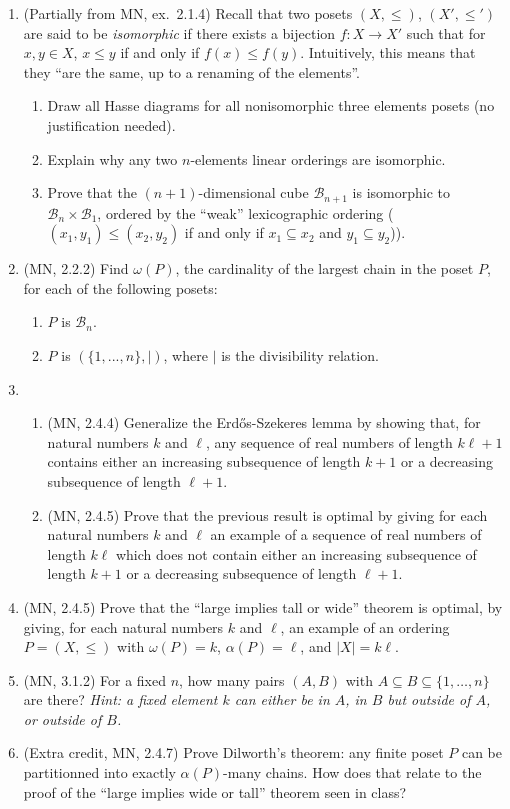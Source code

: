 \documentclass{amsart}
\theoremstyle{definition}
\newcommand{\Bb}{\mathcal{B}}
\begin{document}
\begin{enumerate}
\item (Partially from MN, ex.\ 2.1.4) Recall that two posets $(X, \le)$, $(X', \le')$ are said to be \emph{isomorphic} if there exists a bijection $f: X \to X'$ such that for $x, y \in X$, $x \le y$ if and only if $f (x) \le f (y)$. Intuitively, this means that they ``are the same, up to a renaming of the elements''.
  \begin{enumerate}
  \item Draw all Hasse diagrams for all nonisomorphic three elements posets (no justification needed).
  \item Explain why any two $n$-elements linear orderings are isomorphic.
  \item Prove that the $(n + 1)$-dimensional cube $\Bb_{n + 1}$ is isomorphic to $\Bb_n \times \Bb_1$, ordered by the ``weak'' lexicographic ordering ($(x_1, y_1) \le (x_2, y_2)$ if and only if $x_1 \subseteq x_2$ and $y_1 \subseteq y_2$)).
  \end{enumerate}
\item (MN, 2.2.2) Find $\omega (P)$, the cardinality of the largest chain in the poset $P$, for each of the following posets:
  \begin{enumerate}
  \item $P$ is $\Bb_n$.
  \item $P$ is $(\{1, ..., n\}, |)$, where $|$ is the divisibility relation.    
  \end{enumerate}
\item \begin{enumerate}
\item (MN, 2.4.4) Generalize the Erdős-Szekeres lemma by showing that, for natural numbers $k$ and $\ell$, any sequence of real numbers of length $k \ell + 1$ contains either an increasing subsequence of length $k + 1$ or a decreasing subsequence of length $\ell + 1$.

\item (MN, 2.4.5) Prove that the previous result is optimal by giving for each natural numbers $k$ and $\ell$ an example of a sequence of real numbers of length $k \ell$ which does not contain either an increasing subsequence of length $k + 1$ or a decreasing subsequence of length $\ell + 1$.
\end{enumerate}
\item (MN, 2.4.5)
  Prove that the ``large implies tall or wide'' theorem is optimal, by giving, for each natural numbers $k$ and $\ell$, an example of an ordering $P = (X, \le)$ with $\omega (P) = k$, $\alpha (P) = \ell$, and $|X| = k \ell$.

\item (MN, 3.1.2) For a fixed $n$, how many pairs $(A, B)$ with $A \subseteq B \subseteq \{1, \ldots, n\}$ are  there? \emph{Hint: a fixed element $k$ can either be in $A$, in $B$ but outside of $A$, or outside of $B$.}
\item (Extra credit, MN, 2.4.7) Prove Dilworth's theorem: any finite poset $P$ can be partitionned into exactly $\alpha (P)$-many chains. How does that relate to the proof of the ``large implies wide or tall'' theorem seen in class?
\end{enumerate}
\end{document}

